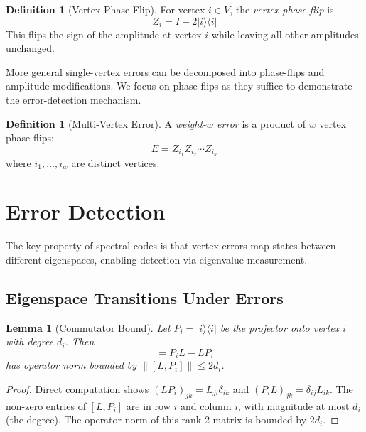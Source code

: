 \documentclass[11pt,a4paper]{article}
\newtheorem{lemma}[theorem]{Lemma}
\theoremstyle{definition}
\newtheorem{definition}[theorem]{Definition}
\newcommand{\ketbra}[2]{|#1\rangle\!\langle#2|}
\begin{document}
\begin{definition}[Vertex Phase-Flip]
For vertex $i \in V$, the \emph{vertex phase-flip} is
\begin{equation}
    Z_i = I - 2\ketbra{i}{i}
\end{equation}
This flips the sign of the amplitude at vertex $i$ while leaving all other amplitudes unchanged.
\end{definition}

More general single-vertex errors can be decomposed into phase-flips and amplitude modifications. We focus on phase-flips as they suffice to demonstrate the error-detection mechanism.

\begin{definition}[Multi-Vertex Error]
A \emph{weight-$w$ error} is a product of $w$ vertex phase-flips:
\begin{equation}
    E = Z_{i_1} Z_{i_2} \cdots Z_{i_w}
\end{equation}
where $i_1, \ldots, i_w$ are distinct vertices.
\end{definition}

\section{Error Detection}
\label{sec:error_detection}

The key property of spectral codes is that vertex errors map states between different eigenspaces, enabling detection via eigenvalue measurement.

\subsection{Eigenspace Transitions Under Errors}

\begin{lemma}[Commutator Bound]
\label{lem:commutator}
Let $P_i = \ketbra{i}{i}$ be the projector onto vertex $i$ with degree $d_i$. Then
\begin{equation}
    [L, P_i] = P_i L - L P_i
\end{equation}
has operator norm bounded by $\|[L, P_i]\| \leq 2d_i$.
\end{lemma}

\begin{proof}
Direct computation shows $(LP_i)_{jk} = L_{ji}\delta_{ik}$ and $(P_iL)_{jk} = \delta_{ij}L_{ik}$. The non-zero entries of $[L, P_i]$ are in row $i$ and column $i$, with magnitude at most $d_i$ (the degree). The operator norm of this rank-2 matrix is bounded by $2d_i$.
\end{proof}
\end{document}

